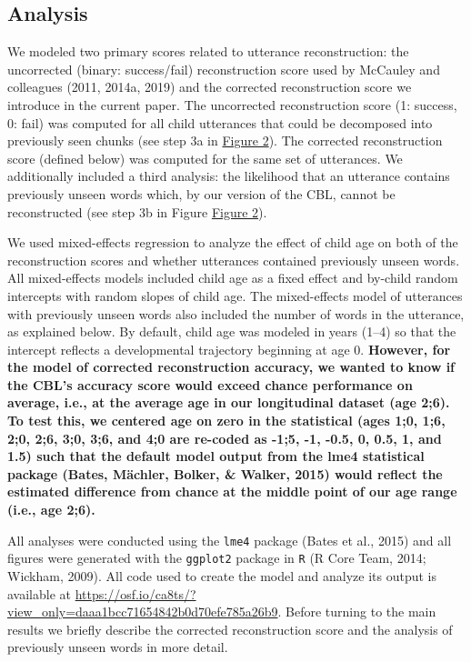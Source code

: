 \documentclass[man,mask,floatsintext]{apa6}
\begin{document}
\subsection{Analysis}\label{analysis}

We modeled two primary scores related to utterance reconstruction: the
uncorrected (binary: success/fail) reconstruction score used by McCauley
and colleagues (2011, 2014a, 2019) and the corrected reconstruction
score we introduce in the current paper. The uncorrected reconstruction
score (1: success, 0: fail) was computed for all child utterances that
could be decomposed into previously seen chunks (see step 3a in
\protect\hyperlink{fig2}{Figure 2}). The corrected reconstruction score
(defined below) was computed for the same set of utterances. We
additionally included a third analysis: the likelihood that an utterance
contains previously unseen words which, by our version of the CBL,
cannot be reconstructed (see step 3b in Figure
\protect\hyperlink{fig2}{Figure 2}).

We used mixed-effects regression to analyze the effect of child age on
both of the reconstruction scores and whether utterances contained
previously unseen words. All mixed-effects models included child age as
a fixed effect and by-child random intercepts with random slopes of
child age. The mixed-effects model of utterances with previously unseen
words also included the number of words in the utterance, as explained
below. By default, child age was modeled in years (1--4) so that the
intercept reflects a developmental trajectory beginning at age 0.
\textbf{However, for the model of corrected reconstruction accuracy, we
wanted to know if the CBL's accuracy score would exceed chance
performance on average, i.e., at the average age in our longitudinal
dataset (age 2;6). To test this, we centered age on zero in the
statistical (ages 1;0, 1;6, 2;0, 2;6, 3;0, 3;6, and 4;0 are re-coded as
-1;5, -1, -0.5, 0, 0.5, 1, and 1.5) such that the default model output
from the lme4 statistical package (Bates, Mächler, Bolker, \& Walker,
2015) would reflect the estimated difference from chance at the middle
point of our age range (i.e., age 2;6).}

All analyses were conducted using the \texttt{lme4} package (Bates et
al., 2015) and all figures were generated with the \texttt{ggplot2}
package in \texttt{R} (R Core Team, 2014; Wickham, 2009). All code used
to create the model and analyze its output is available at
\href{}{https://osf.io/ca8ts/?view\_only=daaa1bcc71654842b0d70efe785a26b9}.
Before turning to the main results we briefly describe the corrected
reconstruction score and the analysis of previously unseen words in more
detail.
\end{document}
